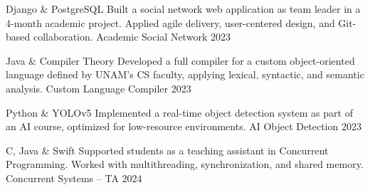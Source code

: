 \begin{cvhonors}

  \cvhonor
    {Django \& PostgreSQL}
    {Built a social network web application as team leader in a 4-month academic project. Applied agile delivery, user-centered design, and Git-based collaboration.}
    {Academic Social Network}
    {2023}

  \cvhonor
    {Java \& Compiler Theory}
    {Developed a full compiler for a custom object-oriented language defined by UNAM’s CS faculty, applying lexical, syntactic, and semantic analysis.}
    {Custom Language Compiler}
    {2023}

  \cvhonor
    {Python \& YOLOv5}
    {Implemented a real-time object detection system as part of an AI course, optimized for low-resource environments.}
    {AI Object Detection}
    {2023}

    \cvhonor
    {C, Java \& Swift}
    {Supported students as a teaching assistant in Concurrent Programming. Worked with multithreading, synchronization, and shared memory.}
    {Concurrent Systems – TA}
    {2024}


\end{cvhonors}
